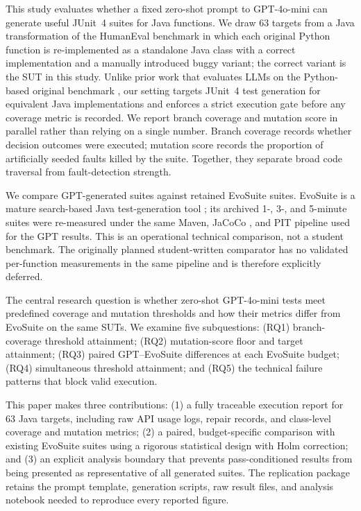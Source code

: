﻿\documentclass[conference]{IEEEtran}
\begin{document}
This study evaluates whether a fixed zero-shot prompt to GPT-4o-mini can generate useful JUnit~4 suites for Java functions. We draw 63 targets from a Java transformation of the HumanEval benchmark in which each original Python function is re-implemented as a standalone Java class with a correct implementation and a manually introduced buggy variant; the correct variant is the SUT in this study. Unlike prior work that evaluates LLMs on the Python-based original benchmark \cite{yuan2024junit}, our setting targets JUnit~4 test generation for equivalent Java implementations and enforces a strict execution gate before any coverage metric is recorded. We report branch coverage and mutation score in parallel rather than relying on a single number. Branch coverage records whether decision outcomes were executed; mutation score records the proportion of artificially seeded faults killed by the suite. Together, they separate broad code traversal from fault-detection strength.

We compare GPT-generated suites against retained EvoSuite suites. EvoSuite is a mature search-based Java test-generation tool \cite{fraser2011evosuite}; its archived 1-, 3-, and 5-minute suites were re-measured under the same Maven, JaCoCo \cite{jacoco}, and PIT \cite{coles2016pit} pipeline used for the GPT results. This is an operational technical comparison, not a student benchmark. The originally planned student-written comparator has no validated per-function measurements in the same pipeline and is therefore explicitly deferred.

The central research question is whether zero-shot GPT-4o-mini tests meet predefined coverage and mutation thresholds and how their metrics differ from EvoSuite on the same SUTs. We examine five subquestions: (RQ1) branch-coverage threshold attainment; (RQ2) mutation-score floor and target attainment; (RQ3) paired GPT--EvoSuite differences at each EvoSuite budget; (RQ4) simultaneous threshold attainment; and (RQ5) the technical failure patterns that block valid execution.

This paper makes three contributions: (1) a fully traceable execution report for 63 Java targets, including raw API usage logs, repair records, and class-level coverage and mutation metrics; (2) a paired, budget-specific comparison with existing EvoSuite suites using a rigorous statistical design with Holm correction; and (3) an explicit analysis boundary that prevents pass-conditioned results from being presented as representative of all generated suites. The replication package retains the prompt template, generation scripts, raw result files, and analysis notebook needed to reproduce every reported figure.
\end{document}
